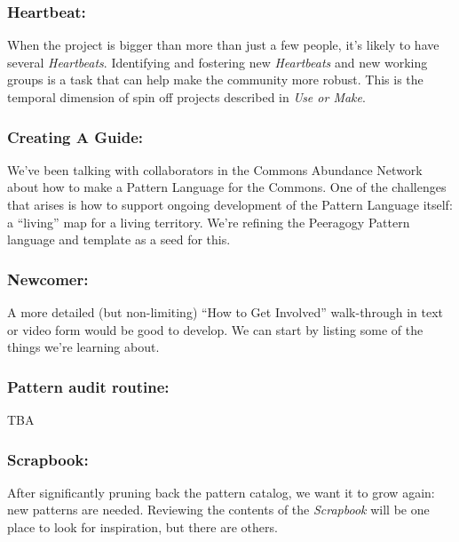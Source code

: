 \subsubsection*{Heartbeat:} When the project is bigger than more than just a few people, it's likely to have several \emph{Heartbeats}.  Identifying and fostering new \emph{Heartbeats} and new working groups is a task that can help make the community more robust.  This is the temporal dimension of spin off projects described in \emph{Use or Make}.

\subsubsection*{Creating A Guide:} We’ve been talking with collaborators in the Commons Abundance Network
about how to make a Pattern Language for the Commons. One of the
challenges that arises is how to support ongoing development of the
Pattern Language itself: a “living” map for a living territory. We’re
refining the Peeragogy Pattern language and template as a seed for this.

\subsubsection*{Newcomer:} A more detailed (but non-limiting) ``How to Get Involved'' walk-through in text or video form would be good to develop. We can start by listing some of the things we're learning about.

\subsubsection*{Pattern audit routine:}  TBA

\subsubsection*{Scrapbook:} After significantly pruning back the pattern catalog, we want it to grow again: new patterns are needed.  Reviewing the contents of the \emph{Scrapbook} will be one place to look for inspiration, but there are others.



